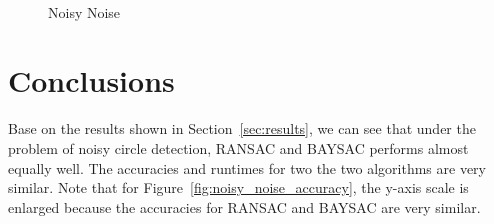 \documentclass[10pt,twocolumn,letterpaper]{article}
\begin{document}
\begin{figure}[!h]
   \centering
   \hfill
   \\
   \hfill

   \caption{Noisy Noise}
   \label{fig:noisy_noise}
\end{figure}

\section{Conclusions}

Base on the results shown in Section~\ref{sec:results}, we can see that under the problem of noisy circle detection, RANSAC and BAYSAC performs almost equally well.
The accuracies and runtimes for two the two algorithms are very similar. Note that for Figure~\ref{fig:noisy_noise_accuracy}, the y-axis scale is enlarged because the accuracies for RANSAC and BAYSAC are very similar.
\end{document}

